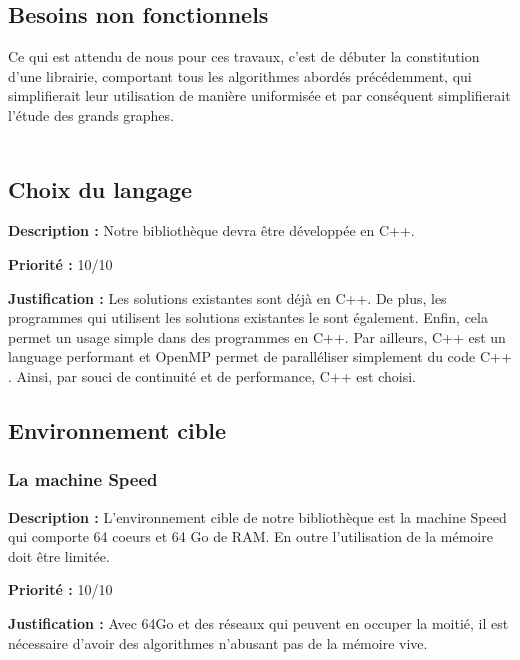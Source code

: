 \begin{titlepage}

\newpage
\begin{center}
\begin{bf}
\section{Besoins non fonctionnels}
\end{bf}
\end{center}

\vspace{1cm}
{
Ce qui est attendu de nous pour ces travaux, c'est de débuter la constitution d'une librairie, comportant tous les algorithmes abordés précédemment, qui simplifierait leur utilisation de manière uniformisée et par conséquent simplifierait l'étude des grands graphes.
\\ \\ 
}

\subsection{Choix du langage}
{
\textbf{Description :} Notre bibliothèque devra être développée en C++.

\textbf{Priorité :} 10/10

\textbf{Justification :} Les solutions existantes sont déjà en C++. De plus, les programmes qui utilisent les solutions existantes le sont également. Enfin, cela permet un usage simple dans des programmes en C++. Par ailleurs, C++ est un language performant et OpenMP permet de paralléliser simplement du code C++ . Ainsi, par souci de continuité et de performance, C++ est choisi.
}

\subsection{Environnement cible}
\subsubsection{La machine Speed}
{
\textbf{Description :} L'environnement cible de notre bibliothèque est la machine Speed qui comporte 64 coeurs et 64 Go de RAM. En outre l'utilisation de la mémoire doit être limitée.

\textbf{Priorité :} 10/10

\textbf{Justification :} Avec 64Go et des réseaux qui peuvent en occuper la moitié, il est nécessaire d'avoir des algorithmes n'abusant pas de la mémoire vive.
}


\end{titlepage}

